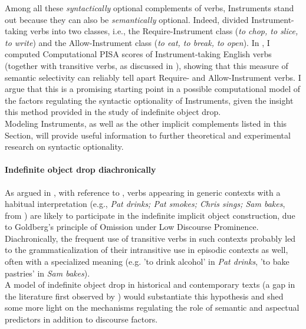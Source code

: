 Among all these \textit{syntactically} optional complements of verbs, Instruments stand out because they can also be \textit{semantically} optional. Indeed, \textcite{KoenigEtAl2002, KoenigEtAl2003, KoenigEtAl2007} divided Instrument-taking verbs into two classes, i.e., the Require-Instrument class (\textit{to chop, to slice, to write}) and the Allow-Instrument class (\textit{to eat, to break, to open}). In \textcite{CappelliLenciPISA}, I computed Computational PISA scores of Instrument-taking English verbs (together with transitive verbs, as discussed in ), showing that this measure of semantic selectivity can reliably tell apart Require- and Allow-Instrument verbs. I argue that this is a promising starting point in a possible computational model of the factors regulating the syntactic optionality of Instruments, given the insight this method provided in the study of indefinite object drop.\\
Modeling Instruments, as well as the other implicit complements listed in this Section, will provide useful information to further theoretical and experimental research on syntactic optionality.

\paragraph{Indefinite object drop diachronically}
As argued in , with reference to \textcite{Goldberg2001, Goldberg2005a, Lorenzetti2008, Glass2020}, verbs appearing in generic contexts with a habitual interpretation (e.g., \textit{Pat drinks; Pat smokes; Chris sings; Sam bakes}, from \textcite[518]{Goldberg2001}) are likely to participate in the indefinite implicit object construction, due to Goldberg's principle of Omission under Low Discourse Prominence. Diachronically, the frequent use of transitive verbs in such contexts probably led to the grammaticalization of their intransitive use in episodic contexts as well, often with a specialized meaning (e.g. 'to drink alcohol' in \textit{Pat drinks}, 'to bake pastries' in \textit{Sam bakes}).\\
A model of indefinite object drop in historical and contemporary texts (a gap in the literature first observed by \textcite{Goldberg2001}) would substantiate this hypothesis and shed some more light on the mechanisms regulating the role of semantic and aspectual predictors in addition to discourse factors.

